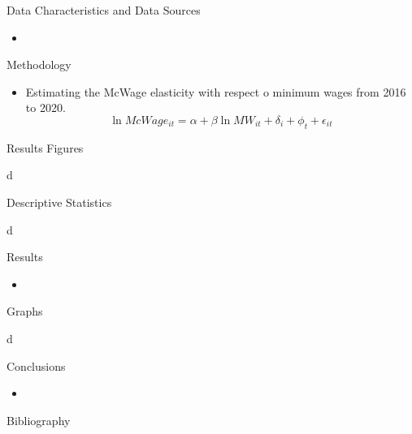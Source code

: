 \documentclass[12pt]{beamer}
\begin{document}
\begin{frame}[allowframebreaks]{Data Characteristics and Data Sources}
	\begin{itemize}
		\item
	\end{itemize}
\end{frame}

\begin{frame}[allowframebreaks]{Methodology}
	\begin{itemize}
		\item Estimating the McWage elasticity with respect o minimum wages from 2016 to 2020.
		      \begin{equation}
			      \ln{McWage_{it}} = \alpha + \beta \ln{MW_{it}} + \delta_{i} + \phi_{t} + \epsilon_{it}
		      \end{equation}
	\end{itemize}

\end{frame}

\begin{frame}[allowframebreaks]{Results Figures}
	\begin{center}
		d
	\end{center}
\end{frame}

\begin{frame}[allowframebreaks]{Descriptive Statistics}
	\begin{center}
		d
	\end{center}
\end{frame}

\begin{frame}[allowframebreaks]{Results}
	\begin{itemize}
		\item
	\end{itemize}
\end{frame}

\begin{frame}[allowframebreaks]{Graphs}
	\begin{center}
		d
	\end{center}
\end{frame}

\begin{frame}[allowframebreaks]{Conclusions}
	\begin{itemize}
		\item
	\end{itemize}
\end{frame}
\begin{frame}[allowframebreaks]{Bibliography}
	\printbibliography
\end{frame}
\end{document}
